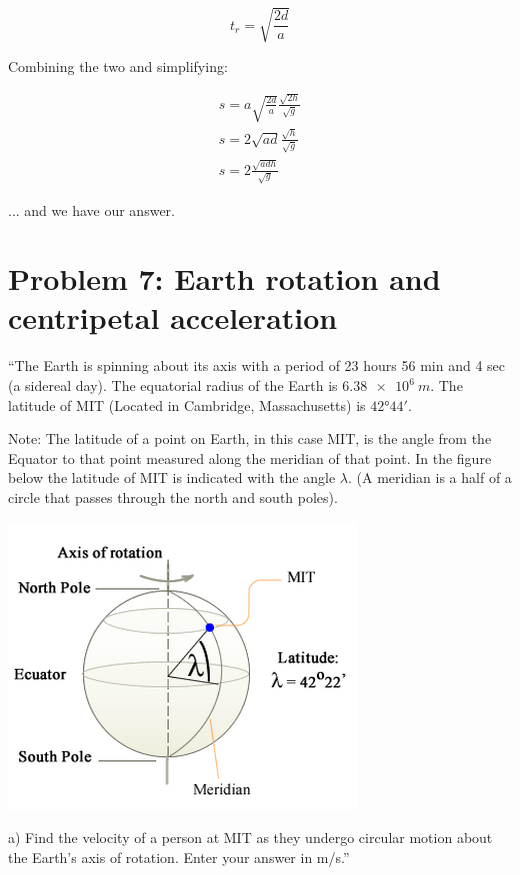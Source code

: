 \documentclass[8.01x]{subfiles}
\begin{document}
\begin{equation}
t_r = \sqrt{\frac{2 d}{a}}
\end{equation}

Combining the two and simplifying:

\begin{align}
s = a \sqrt{\frac{2 d}{a}} \frac{\sqrt{2h}}{\sqrt{g}}\\
s = 2\sqrt{a d} \frac{\sqrt{h}}{\sqrt{g}}\\
s = 2 \frac{\sqrt{a d h}}{\sqrt{g}}
\end{align}

... and we have our answer.

\section{Problem 7: Earth rotation and centripetal acceleration}

``The Earth is spinning about its axis with a period of 23 hours 56 min and 4 sec (a sidereal day). The equatorial radius of the Earth is $\SI{6.38e6}{m}$. The latitude of MIT (Located in Cambridge, Massachusetts) is $\ang{42;44;}$.

Note: The latitude of a point on Earth, in this case MIT, is the angle from the Equator to that point measured along the meridian of that point. In the figure below the latitude of MIT is indicated with the angle $\lambda$. (A meridian is a half of a circle that passes through the north and south poles).

\begin{center}
\includegraphics[scale=0.75]{Graphics/h2p7}
\end{center}

a) Find the velocity of a person at MIT as they undergo circular motion about the Earth's axis of rotation. Enter your answer in m/s.''
\end{document}
